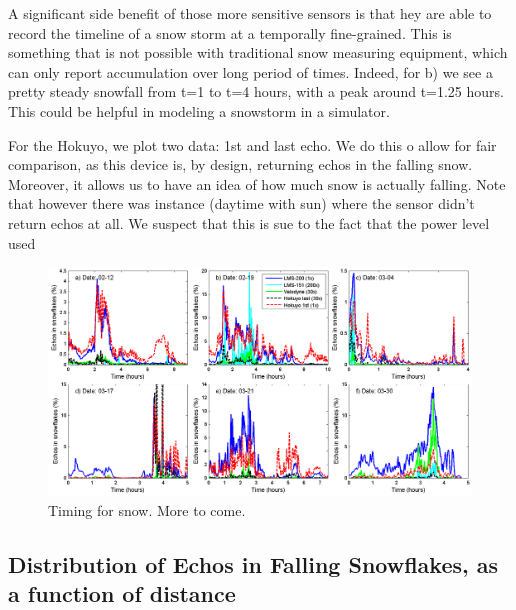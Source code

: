A significant side benefit of those more sensitive sensors is that hey are able to record the timeline of a snow storm at a temporally fine-grained. This is something that is not possible with traditional snow measuring equipment, which can only report accumulation over long period of times. Indeed, for b) we see a pretty steady snowfall from t=1 to t=4 hours, with a peak around t=1.25 hours. This could be helpful in modeling a snowstorm in a simulator. 



For the Hokuyo, we plot two data: 1st and last echo. We do this o allow for fair comparison, as this device is, by design, returning echos in the falling snow. Moreover, it allows us to have an idea of how much  snow is actually falling. Note that however there was instance (daytime with sun) where the sensor didn't return  echos at all. We suspect that this is sue to the fact that the power level used

\begin{figure}[th]
    \centering
    \includegraphics[width=0.98\linewidth]{./img/TimingSnow.png}
    \caption{Timing for snow. More to come.}
    \label{fig:TimingSnow}
\end{figure}


\subsection{Distribution of Echos in Falling Snowflakes, as a function of distance}
\label{subsub:Histo}

